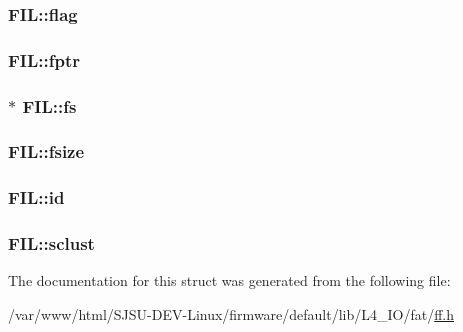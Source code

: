 \subsubsection[{\texorpdfstring{flag}{flag}}]{ F\+I\+L\+::flag}\hypertarget{structFIL_ac409508881f5a16f2998ae675072b376}{}\label{structFIL_ac409508881f5a16f2998ae675072b376}
\subsubsection[{\texorpdfstring{fptr}{fptr}}]{ F\+I\+L\+::fptr}\hypertarget{structFIL_a75d29cf9257c827d117887b9f924c4a9}{}\label{structFIL_a75d29cf9257c827d117887b9f924c4a9}
\subsubsection[{\texorpdfstring{fs}{fs}}]{$\ast$ F\+I\+L\+::fs}\hypertarget{structFIL_a42376a6797a06228911c8b836c1e9030}{}\label{structFIL_a42376a6797a06228911c8b836c1e9030}
\subsubsection[{\texorpdfstring{fsize}{fsize}}]{ F\+I\+L\+::fsize}\hypertarget{structFIL_aa00790d40d7b0081c345fd4f76e22b70}{}\label{structFIL_aa00790d40d7b0081c345fd4f76e22b70}
\subsubsection[{\texorpdfstring{id}{id}}]{ F\+I\+L\+::id}\hypertarget{structFIL_af7cae0063b0045fb7078b560101ba8f2}{}\label{structFIL_af7cae0063b0045fb7078b560101ba8f2}
\subsubsection[{\texorpdfstring{sclust}{sclust}}]{ F\+I\+L\+::sclust}\hypertarget{structFIL_ad308b74c8d6975c6a9c30d90b4124c40}{}\label{structFIL_ad308b74c8d6975c6a9c30d90b4124c40}


The documentation for this struct was generated from the following file\+:\begin{DoxyCompactItemize}
\item 
/var/www/html/\+S\+J\+S\+U-\/\+D\+E\+V-\/\+Linux/firmware/default/lib/\+L4\+\_\+\+I\+O/fat/\hyperlink{ff_8h}{ff.\+h}\end{DoxyCompactItemize}
